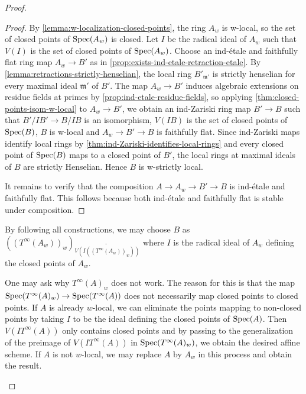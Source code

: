 \begin{proof}
\begin{proof}
    By \ref{lemma:w-localization-closed-points}, the ring $A_w$ is w-local, so the set of closed points
    of $\mathrm{Spec}(A_w)$ is closed.
    Let $I$ be the radical ideal of $A_w$ such that $V(I)$ is the set of closed points of $\mathrm{Spec}(A_w)$.
    Choose an ind-étale and faithfully flat ring map $A_w \to B'$ as in
    \ref{prop:exists-ind-etale-retraction-etale}. By
    \ref{lemma:retractions-strictly-henselian}, the local ring $B'_{\mathfrak{m}'}$ is
    strictly henselian for every maximal ideal $\mathfrak{m}'$ of $B'$.
    The map $A_w \to B'$ induces algebraic extensions on residue fields at primes by
    \ref{prop:ind-etale-residue-fields},
    so applying \ref{thm:closed-points-isom-w-local} to $A_w \to B'$, we obtain
    an ind-Zariski ring map $B' \to B$ such that $B'/IB' \to B/IB$ is an isomorphism,
    $V(IB)$ is the set of closed points of $\mathrm{Spec}(B)$, $B$ is w-local
    and $A_w \to B' \to B$ is faithfully flat. Since ind-Zariski maps identify
    local rings by \ref{thm:ind-Zariski-identifies-local-rings} and every closed point of
    $\mathrm{Spec}(B)$ maps to a closed point of $B'$,
    the local rings at maximal ideals of $B$ are strictly Henselian. Hence $B$ is w-strictly local.

    It remains to verify that the composition $A \to A_w \to B' \to B$ is ind-étale and faithfully flat.
    This follows because both ind-étale and faithfully flat is stable under composition.
\end{proof}

\begin{remark}
    By following all constructions, we may choose $B$
    as $((T^{\infty}(A_w))_w)_{\widetilde{V(I ((T^{\infty}(A_w))_w))}}$
    where $I$ is the radical ideal of $A_w$ defining the closed points of $A_w$.

    One may ask why $T^\infty(A)_w$ does not work. The reason for this is
    that the map $\mathrm{Spec}(T^{\infty}(A)_w) \to \mathrm{Spec}(T^{\infty}(A))$ does not necessarily
    map closed points to closed points. If $A$ is already $w$-local,
    we can eliminate the points mapping to non-closed points by taking $I$ to be the ideal defining
    the closed points of $\mathrm{Spec}(A)$.
    Then $V(I T^{\infty}(A))$ only contains closed points and by
    passing to the generalization of the preimage of $V(I T^{\infty}(A))$ in
    $\mathrm{Spec}(T^{\infty}(A)_w)$, we obtain the desired affine scheme. If $A$ is not $w$-local,
    we may replace $A$ by $A_w$ in this process and obtain the result.
\end{remark}


\end{proof}
